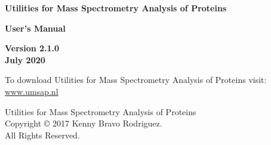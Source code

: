 \clearpage
\thispagestyle{empty}
\begin{center}
{\Huge\textbf{Utilities for Mass Spectrometry Analysis of Proteins}}

\vspace{60pt}

{\huge \textbf{User's Manual}}

\vspace{70pt}

{\Large \textbf{Version \num[parse-numbers=false,detect-weight]{2.1.0} \\ \vspace{10pt} July \num[detect-weight]{2020}}}

\vspace{140pt}

To download Utilities for Mass Spectrometry Analysis of Proteins visit: \\
\href{https://www.umsap.nl}{www.umsap.nl}

\vspace*{\fill}
Utilities for Mass Spectrometry Analysis of Proteins \\Copyright © \num[detect-weight]{2017} Kenny Bravo Rodriguez. \\All Rights Reserved.

\end{center}

\newpage
\thispagestyle{empty}
 \label{sec:tableofcontent}
\tableofcontents

\newpage
\thispagestyle{empty}
 \label{sec:listoffig}
\listoffigures

\newpage
\thispagestyle{empty}
 \label{sec:listoftables}
\listoftables